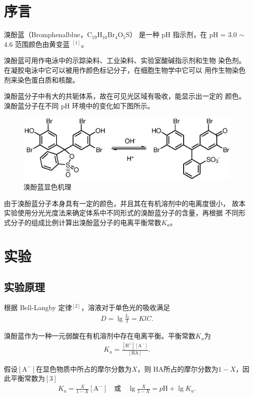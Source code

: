 \documentclass[12pt]{ctexart}
\numberwithin{equation}{section}
\begin{document}
\section{序言}

溴酚蓝（Bromphenalblue，$\mathrm{C_{19}H_{10}Br_{4}O_{5}S}$）
是一种 pH 指示剂，在 pH = 3.0 $\sim$ 4.6 范围颜色由黄变蓝
$^{[1]}$。

溴酚蓝可用作电泳中的示踪染料、工业染料、实验室酸碱指示剂和生物
染色剂。在凝胶电泳中它可以被用作颜色标记分子，在细胞生物学中它可以
用作生物染色剂来染色蛋白质和核酸。

溴酚蓝分子中有大的共轭体系，故在可见光区域有吸收，能显示出一定的
颜色。溴酚蓝分子在不同 pH 环境中的变化如下图所示。

\begin{figure}[!h]
    \centering
    \includegraphics[scale=1]{bb.eps}
    \caption{溴酚蓝显色机理}
\end{figure}

由于溴酚蓝分子本身具有一定的颜色，并且其在有机溶剂中的电离度很小，
故本实验使用分光光度法来确定体系中不同形式的溴酚蓝分子的含量，再根据
不同形式分子的组成比例计算出溴酚蓝分子的电离平衡常数$K_a$。

\section{实验}
\subsection{实验原理}

根据 Bell-Langby 定律$^{[2]}$，溶液对于单色光的吸收满足
\begin{align}
    D = \lg\frac{I_0}{I} = KlC.
\end{align}

溴酚蓝作为一种一元弱酸在有机溶剂中存在电离平衡。平衡常数$K_a$为
\begin{align}
    K_a = \mathrm{\frac{[H^+][A^-]}{[HA]}}.
\end{align}

假设$\mathrm{[A^-]}$在显色物质中所占的摩尔分数为$X$，则
$\mathrm{HA}$所占的摩尔分数为$1-X$，因此平衡常数为${[3]}$
\begin{align}
    K_a = \frac{X}{1-X}\mathrm{[A^-]}\quad \text{或}\quad
    \lg\frac{X}{1-X} = p\mathrm{H} + \lg K_a.
\end{align}
\end{document}
